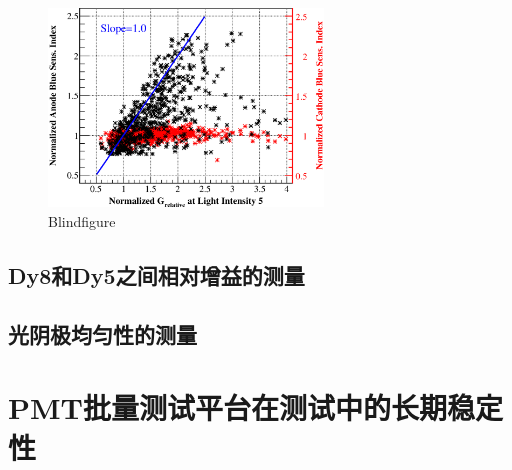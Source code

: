 \begin{figure}[htbp]
	\centering
	\includegraphics[width=0.65\textwidth]{chap/pmt_test/fig/gain_vs_bluesensitivity.eps}
	\caption{Blindfigure}
	\label{fig:pmt_test:gain_vs_bluesensitivity}
\end{figure}


\subsection{Dy8和Dy5之间相对增益的测量}
\label{sec:pmt_test:dy58}

\subsection{光阴极均匀性的测量}
\label{sec:pmt_test:cathode_scanning}

\section{PMT批量测试平台在测试中的长期稳定性}
\label{sec:pmt_test:testbench_performance}

